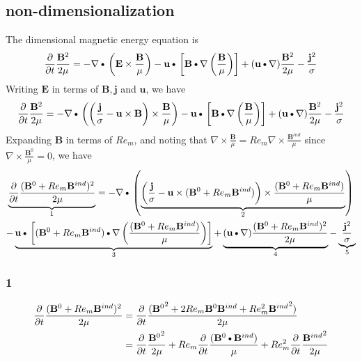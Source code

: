 \documentclass[11pt]{article}
\newcommand{\B}{\mathbf{B}}
\newcommand{\PD}{\partial}
\newcommand{\BM}{\frac{\mathbf{B}}{\mu}}
\newcommand{\J}{\mathbf{j}}
\newcommand{\E}{\mathbf{E}}
\newcommand{\JS}{\frac{\mathbf{j}}{\sigma}}
\newcommand{\JSS}{\frac{\mathbf{j}^2}{\sigma}}
\newcommand{\U}{\mathbf{u}}
\newcommand{\DOT}{\text{\textbullet}}
\begin{document}
\subsection{non-dimensionalization}
The dimensional magnetic energy equation is
\begin{equation}
	\frac{\PD}{\PD t} \frac{\B^2}{2\mu}
	=
	- \nabla \DOT \left(\E \times \BM \right)
	- \U \DOT \left[\B \DOT \nabla \left( \BM \right) \right]
	+ (\U \DOT \nabla) \frac{\B^2}{2\mu}
	- \JSS
\end{equation}
Writing $\E$ in terms of $\B,\J$ and $\U$, we have
\begin{equation}
	\frac{\PD}{\PD t} \frac{\B^2}{2\mu}
	=
	- \nabla \DOT \left( \left(\JS - \U \times \B \right) \times \BM \right)
	- \U \DOT \left[\B \DOT \nabla \left( \BM \right) \right]
	+ (\U \DOT \nabla) \frac{\B^2}{2\mu}
	- \JSS
\end{equation}
Expanding $\B$ in terms of $Re_m$, and noting that $\nabla \times \frac{\B}{\mu} = Re_m \nabla \times \frac{\B^{ind}}{\mu}$ since $\nabla \times \frac{\B^0}{\mu} = 0$, we have
\begin{multline}
	\underbrace{\frac{\PD}{\PD t} \frac{(\B^0 + Re_m \B^{ind})^2}{2\mu}}_{1}
	=
	- \nabla \DOT \left( \underbrace{ \left(\JS - \U \times (\B^0 + Re_m \B^{ind}) \right) \times \frac{(\B^0 + Re_m \B^{ind})}{\mu} }_{2} \right) \\
	- \underbrace{\U \DOT \left[(\B^0 + Re_m \B^{ind}) \DOT \nabla \left( \frac{(\B^0 + Re_m \B^{ind})}{\mu} \right) \right]}_{3}
	+ \underbrace{(\U \DOT \nabla) \frac{(\B^0 + Re_m \B^{ind})^2}{2\mu}}_{4}
	- \underbrace{\JSS}_{5}
\end{multline}
\subsubsection{1}
\begin{align}
	\frac{\PD}{\PD t} \frac{(\B^0 + Re_m \B^{ind})^2}{2\mu} \notag
	& = \frac{\PD}{\PD t} \frac{({\B^0}^2 + 2 Re_m \B^0 \B^{ind} + Re_m^2 {\B^{ind}}^2)}{2\mu} \notag \\
	& = \frac{\PD}{\PD t} \frac{{\B^0}^2}{2 \mu} + Re_m \frac{\PD}{\PD t} \frac{(\B^0 \DOT \B^{ind})}{\mu} + Re_m^2 \frac{\PD}{\PD t} \frac{{\B^{ind}}^2}{2 \mu} \notag \\
\end{align}
\end{document}
